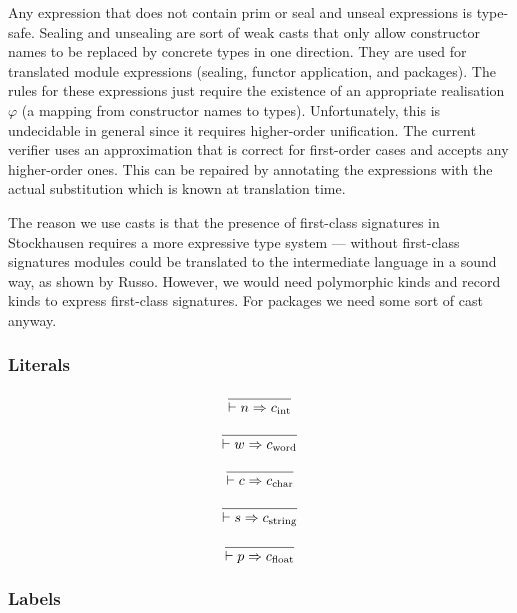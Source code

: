 \documentclass[twoside]{article}
\newcommand{\x}[1]{\mathit{#1}}
\newcommand{\f}[1]{\mbox{#1}}
\renewcommand{\c}[1]{c_{\f{\scriptsize #1}}}
\newcommand{\lab}{\x{lab}}
\newcommand{\lit}{\x{lit}}
\begin{document}
Any expression that does not contain \f{prim} or \f{seal} and \f{unseal} expressions is type-safe. Sealing and unsealing are sort of weak casts that only allow constructor names to be replaced by concrete types in one direction. They are used for translated module expressions (sealing, functor application, and packages). The rules for these expressions just require the existence of an appropriate realisation $\varphi$ (a mapping from constructor names to types). Unfortunately, this is undecidable in general since it requires higher-order unification. The current verifier uses an approximation that is correct for first-order cases and accepts any higher-order ones. This can be repaired by annotating the expressions with the actual substitution which is known at translation time.

The reason we use casts is that the presence of first-class signatures in Stockhausen requires a more expressive type system --- without first-class signatures modules could be translated to the intermediate language in a sound way, as shown by Russo. However, we would need polymorphic kinds and record kinds to express first-class signatures. For packages we need some sort of cast anyway.


\subsubsection*{Literals \hfill
\fbox{$\vdash \lit \Rightarrow t$}
}

\begin{equation}
\frac{}{
\vdash n \Rightarrow \c{int}
}
\end{equation}

\begin{equation}
\frac{}{
\vdash w \Rightarrow \c{word}
}
\end{equation}

\begin{equation}
\frac{}{
\vdash c \Rightarrow \c{char}
}
\end{equation}

\begin{equation}
\frac{}{
\vdash s \Rightarrow \c{string}
}
\end{equation}

\begin{equation}
\frac{}{
\vdash p \Rightarrow \c{float}
}
\end{equation}



\subsubsection*{Labels \hfill
\fbox{$\vdash \lab \Rightarrow l$}
}
\end{document}
